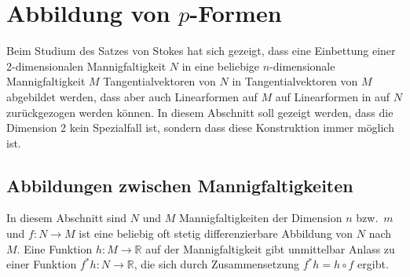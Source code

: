 %
%
\section{Abbildung von $p$-Formen
\label{buch:pformen:section:abbildung}}
%
Beim Studium des Satzes von Stokes hat sich gezeigt, dass eine
Einbettung einer 2-dimensionalen Mannigfaltigkeit $N$ in eine beliebige
$n$-dimensionale Mannigfaltigkeit $M$ Tangentialvektoren von $N$ in
Tangentialvektoren von $M$ abgebildet werden, dass aber auch Linearformen
auf $M$ auf Linearformen in auf $N$ zurückgezogen werden können.
In diesem Abschnitt soll gezeigt werden, dass die Dimension 2
kein Spezialfall ist, sondern dass diese Konstruktion immer möglich ist.

%
%
\subsection{Abbildungen zwischen Mannigfaltigkeiten}
In diesem Abschnitt sind $N$ und $M$ Mannigfaltigkeiten der Dimension
$n$ bzw.~$m$ und $f\colon N\to M$ ist eine beliebig oft stetig
differenzierbare Abbildung von $N$ nach $M$.
Eine Funktion $h\colon M\to\mathbb{R}$ auf der Mannigfaltigkeit gibt
unmittelbar Anlass zu einer Funktion $f^*h\colon N\to\mathbb{R}$,
die sich durch Zusammensetzung $f^*h=h\circ f$ ergibt.

%
%
